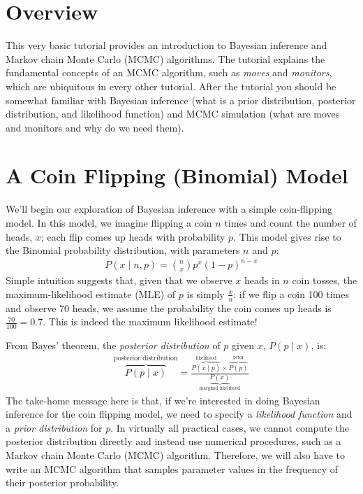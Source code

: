 \section{Overview}

This very basic tutorial provides an introduction to Bayesian inference and Markov chain Monte Carlo (MCMC) algorithms.
The tutorial explains the fundamental concepts of an MCMC algorithm, such as \emph{moves} and \emph{monitors}, which are ubiquitous in every other tutorial.
After the tutorial you should be somewhat familiar with Bayesian inference (\EG what is a prior distribution, posterior distribution, and likelihood function) and MCMC simulation (\EG what are moves and monitors and why do we need them).

\section{A Coin Flipping (Binomial) Model}

We'll begin our exploration of Bayesian inference with a simple coin-flipping model.
In this model, we imagine flipping a coin $n$ times and count the number of heads, $x$; each flip comes up heads with probability $p$.
This model gives rise to the Binomial probability distribution, with parameters $n$ and $p$:
\begin{align*}
P(x \mid n,p) = {n \choose x}p^x(1-p)^{n-x}
\end{align*}
Simple intuition suggests that, given that we observe $x$ heads in $n$ coin tosses, the maximum-likelihood estimate (MLE) of $p$ is simply $\frac{x}{n}$: if we flip a coin 100 times and observe 70 heads, we assume the probability the coin comes up heads is $\frac{70}{100} = 0.7$.
This is indeed the maximum likelihood estimate!

From Bayes' theorem, the \emph{posterior distribution} of $p$ given $x$, $P(p \mid x)$, is:
\begin{align*}
\overbrace{P(p \mid x)}^{\text{posterior distribution}} = \frac{ \overbrace{P(x \mid p)}^{\text{likelihood}} \times \overbrace{P(p)}^{\text{prior}}}{\underbrace{P(x)}_{\text{marginal likelihood}}}
\end{align*}
The take-home message here is that, if we're interested in doing Bayesian inference for the coin flipping model, we need to specify a \emph{likelihood function} and a \emph{prior distribution} for $p$.
In virtually all practical cases, we cannot compute the posterior distribution directly and instead use numerical procedures, such as a Markov chain Monte Carlo (MCMC) algorithm.
Therefore, we will also have to write an MCMC algorithm that samples parameter values in the frequency of their posterior probability.


